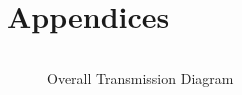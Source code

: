 \documentclass[titlepage]{article}
\begin{document}


{}

\clearpage

\section{Appendices}

\clearpage

\begin{lstlisting}

\end{lstlisting}

\begin{figure}[htb]                                                                       
  \begin{center}
  \end{center}
  \caption{Overall Transmission Diagram}
  \label{fig:transmission}
\end{figure}
\end{document}

